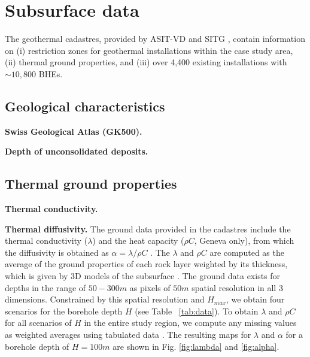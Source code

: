 
\section{Subsurface data}
\label{data_geo}

The geothermal cadastres, provided by ASIT-VD \cite{asit_vd_cadastre_2019-1} and SITG \cite{sitg_cadastre_2019}, contain information on (i) restriction zones for geothermal installations within the case study area, (ii) thermal ground properties, and (iii) over 4,400 existing installations with $\sim 10,800$ BHEs.

\subsection{Geological characteristics}
\textbf{Swiss Geological Atlas (GK500).}

\textbf{Depth of unconsolidated deposits.}

\subsection{Thermal ground properties}

\textbf{Thermal conductivity.}

\textbf{Thermal diffusivity.}
The ground data provided in the cadastres include the thermal conductivity ($\lambda$) and the heat capacity ($\rho C$, Geneva only), from which the diffusivity is obtained as $\alpha = \lambda / \rho C$ \cite{pahud_geothermal_2002}.
The $\lambda$ and $\rho C$ are computed as the average of the ground properties of each rock layer weighted by %
its thickness, which is given by 3D models of the subsurface \cite{groupe_de_travail_pgg_evaluation_2011-1}.
The ground data exists for depths in the range of $50-300m$ as pixels of $50m$ spatial resolution in all 3 dimensions. 
Constrained by this spatial resolution and $H_{max}$, we obtain four scenarios for the borehole depth $H$ (see Table ~\ref{tab:data}).
To obtain $\lambda$ and $\rho C$ for all scenarios of $H$ in the entire study region, we compute any missing values as weighted averages using
tabulated data \cite{groupe_de_travail_pgg_evaluation_2011-1, sia_sondes_2010}. 
The resulting maps for $\lambda$ and $\alpha$ for a borehole depth of $H = 100m$ are shown in Fig. \ref{fig:lambda} and \ref{fig:alpha}.

